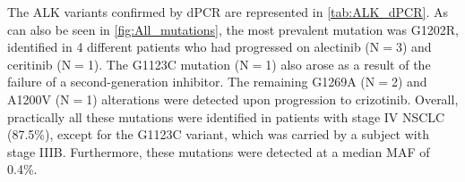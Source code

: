 The ALK variants confirmed by dPCR are represented in \autoref{tab:ALK_dPCR}. As can also be seen in \autoref{fig:All_mutations}, the most prevalent mutation was G1202R, identified in 4 different patients who had progressed on alectinib (N$=$3) and ceritinib (N$=$1). The G1123C mutation (N$=$1) also arose as a result of the failure of a second-generation inhibitor. The remaining G1269A (N$=$2) and A1200V (N$=$1) alterations were detected upon progression to crizotinib. Overall, practically all these mutations were identified in patients with stage IV NSCLC (87.5\%), except for the G1123C variant, which was carried by a subject with stage IIIB. Furthermore, these mutations were detected at a median MAF of 0.4\%.

\begin{table}[ht]
\centering
{}
\caption{Characteristics of the ALK mutations identified in this study.}
\label{tab:ALK_dPCR}
\end{table}


